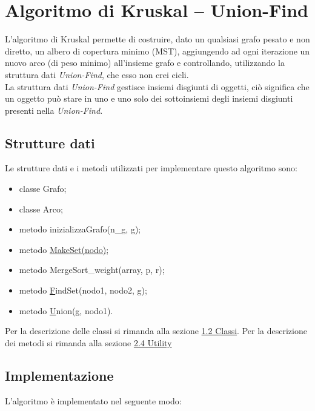 \section{Algoritmo di Kruskal -- Union-Find}
\label{Algoritmo_di_Kruskal_Union-Find}

L'algoritmo di Kruskal permette di costruire, dato un qualsiasi grafo pesato e non diretto, un albero di copertura minimo (MST), aggiungendo ad ogni iterazione un nuovo arco (di peso minimo) all'insieme grafo e controllando, utilizzando la struttura dati \textit{Union-Find}, che esso non crei cicli. \\
La struttura dati \textit{Union-Find} gestisce insiemi disgiunti di oggetti, ciò significa che un oggetto può stare in uno e uno solo dei sottoinsiemi degli insiemi disgiunti presenti nella \textit{Union-Find}.

\subsection{Strutture dati}
\label{strutture_dati}

Le strutture dati e i metodi utilizzati per implementare questo algoritmo sono:

\begin{itemize}
    \item classe Grafo;
    \item classe Arco;
    \item metodo inizializzaGrafo(n\_g, g);
    \item metodo \hyperlink{makeset}{MakeSet(nodo)};
    \item metodo MergeSort\_weight(array, p, r);
    \item metodo \hyperlink{findset}FindSet(nodo1, nodo2, g);
    \item metodo \hyperlink{union}Union(g, nodo1).
\end{itemize}

Per la descrizione delle classi si rimanda alla sezione \hyperlink{section.2}{1.2 Classi}.
\newline
Per la descrizione dei metodi si rimanda alla sezione \hyperlink{subsection.2.4}{2.4 Utility}

\subsection{Implementazione}
\label{implementazione}

L'algoritmo è implementato nel seguente modo:

